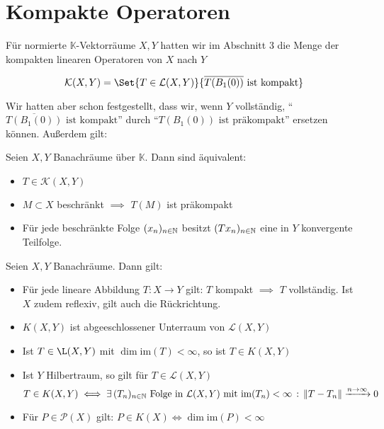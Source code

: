 \documentclass{cheat-sheet}
\newcommand{\K}{\mathbb{K}}
\begin{document}
\section{Kompakte Operatoren}

Für normierte $\K$-Vektorräume $X, Y$ hatten wir im Abschnitt 3 die Menge der kompakten linearen Operatoren von $X$ nach $Y$

\[ \mathcal{K}(X, Y) = \Set{ T \in \mathcal{L}(X, Y) }{ \overline{T(B_1(0))} \text{ ist kompakt} } \]

Wir hatten aber schon festgestellt, dass wir, wenn $Y$ vollständig, "`$\overline{T(B_1(0))} \text{ ist kompakt}$"' durch "`$T(B_1(0)) \text{ ist präkompakt}$"' ersetzen können. Außerdem gilt:

\begin{lem}
  Seien $X, Y$ Banachräume über $\K$. Dann sind äquivalent:
  \begin{itemize}
    \item $T \in \mathcal{K}(X, Y)$
    \item $M \subset X$ beschränkt $\implies$ $T(M)$ ist präkompakt
    \item Für jede beschränkte Folge $(x_n)_{n \in \mathbb{N}}$ besitzt $(T x_n)_{n \in \mathbb{N}}$ eine in $Y$ konvergente Teilfolge.
  \end{itemize}
\end{lem}


\begin{lem}
  Seien $X, Y$ Banachräume. Dann gilt:
  \begin{itemize}
    \item Für jede lineare Abbildung $T : X \to Y$ gilt: $T$ kompakt $\implies$ $T$ vollständig. Ist $X$ zudem reflexiv, gilt auch die Rückrichtung. %
    \item $K(X, Y)$ ist abgeeschlossener Unterraum von $\mathcal{L}(X, Y)$
    \item Ist $T \in \L(X, Y)$ mit $\dim \mathrm{im}(T) < \infty$, so ist $T \in K(X, Y)$
    \item Ist $Y$ Hilbertraum, so gilt für $T \in \mathcal{L}(X, Y)$
    \[ T \in K(X, Y) \iff \exists \, {(T_n)_{n \in \mathbb{N}} \text{ Folge in } \mathcal{L}(X, Y) \text{ mit } \mathrm{im}(T_n) < \infty} \,:\, \lVert T-T_n\rVert \xrightarrow{n \to \infty} 0 \]
    \item Für $P \in \mathcal{P}(X)$ gilt: $P \in K(X) \iff \dim \mathrm{im}(P) < \infty$
  \end{itemize}
\end{lem}
\end{document}
